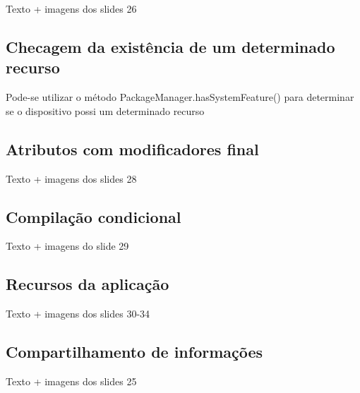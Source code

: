 Texto + imagens dos slides 26

\subsection{Checagem da existência de um determinado recurso}
Pode-se utilizar o método PackageManager.hasSystemFeature() para determinar se o 
dispositivo possi um determinado recurso

\subsection{Atributos com modificadores final}

Texto + imagens dos slides 28


\subsection{Compilação condicional}

Texto + imagens do slide 29


\subsection{Recursos da aplicação}

Texto + imagens dos slides 30-34


\subsection{Compartilhamento de informações}

Texto + imagens dos slides 25

